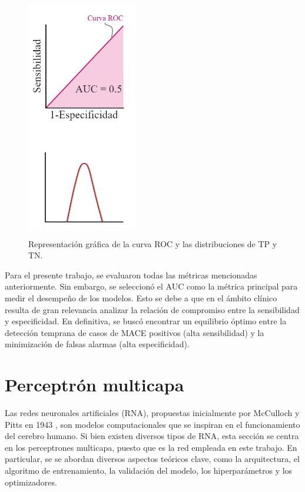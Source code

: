 \begin{figure}[h!]
	[0.3\linewidth]{\includegraphics[height=10cm]{./Figures/ROC_c.jpg}}
	\caption{Representación gráfica de la curva ROC y las distribuciones de TP y TN\protect\footnotemark.}
\end{figure}

Para el presente trabajo, se evaluaron todas las métricas mencionadas anteriormente. Sin embargo, se seleccionó 
el AUC como la métrica principal para medir el desempeño de los modelos. Esto se debe a que en el ámbito clínico 
resulta de gran relevancia analizar la relación de compromiso entre la sensibilidad y especificidad. En definitiva, 
se buscó encontrar un equilibrio óptimo entre la detección temprana de casos de MACE positivos (alta sensibilidad) 
y la minimización de falsas alarmas (alta especificidad). 


\section{Perceptrón multicapa}
\label{sec:Perceptrón multicapa}

Las redes neuronales artificiales (RNA), propuestas inicialmente por McCulloch y Pitts en 1943 
\citep{CITE:41}, son modelos computacionales que se inspiran en el funcionamiento del cerebro 
humano. Si bien existen diversos tipos de RNA, esta sección se centra en los perceptrones 
multicapa, puesto que es la red empleada en este trabajo. En particular, se se abordan diversos 
aspectos teóricos clave, como la arquitectura, el algoritmo de entrenamiento, la validación del 
modelo, los hiperparámetros y los optimizadores. 
